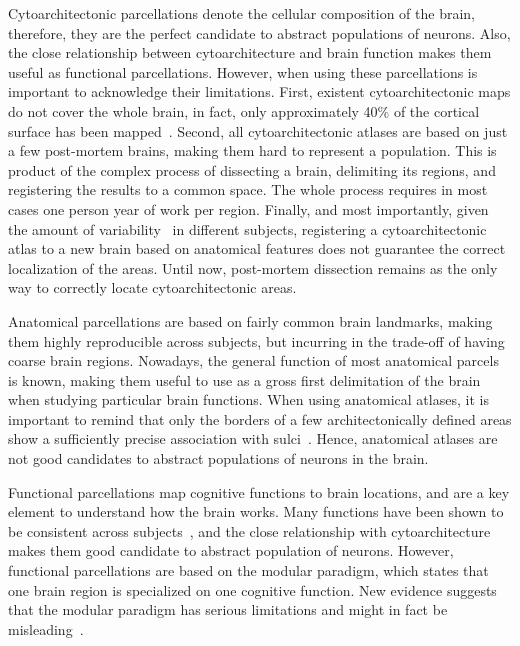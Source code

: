Cytoarchitectonic parcellations denote the cellular composition of the brain,
therefore, they are the perfect candidate to abstract populations of neurons.
Also, the close relationship between cytoarchitecture and brain function\cite{Amunts2007}
makes them useful as functional parcellations.
However, when using these parcellations is important to acknowledge their limitations.
First, existent cytoarchitectonic maps do not cover the whole brain, in fact, only 
approximately 40\% of the cortical surface has been mapped~\cite{Amunts2007}. Second, all cytoarchitectonic atlases are based on just
a few post-mortem brains, making them hard to represent a population. This is
product of the complex process of dissecting a brain, delimiting its regions,
and registering the results to a common space. The whole process requires in most
cases one person year of work per region. Finally, and most importantly, given the
amount of variability~\cite{Zilles2013} in different subjects, registering a 
cytoarchitectonic atlas to a new brain based on anatomical features does not
guarantee the correct localization of the areas. Until now, post-mortem dissection
remains as the only way to correctly locate cytoarchitectonic areas.

Anatomical parcellations are based on fairly common brain landmarks, making them
highly reproducible across subjects, but incurring in the trade-off of having coarse
brain regions. Nowadays, the general function of most anatomical parcels is
known, making them useful to use as a gross first delimitation of the brain
when studying particular brain functions. When using anatomical atlases, it is
important to remind that only the borders of a few architectonically
defined areas show a sufficiently precise association with sulci~\cite{Amunts2007}.
Hence, anatomical atlases are not good candidates to abstract populations
of neurons in the brain.

Functional parcellations map cognitive functions to brain locations, and are
a key element to understand how the brain works. Many functions have been shown
to be consistent across subjects~\cite{Johns, Penfield1954, Yeo2011},
and the close relationship with cytoarchitecture makes them good candidate to
abstract population of neurons. However, functional parcellations are based
on the modular paradigm, which states that one brain region is specialized
on one cognitive function. New evidence suggests that the modular paradigm has serious
limitations and might in fact be misleading~\cite{Bressler2010}.

